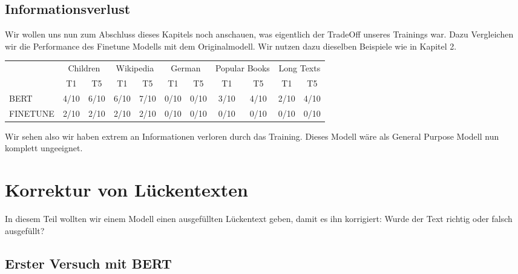 \documentclass[a4paper, 11pt]{article}          %
\begin{document}
\subsection{Informationsverlust}
Wir wollen uns nun zum Abschluss dieses Kapitels noch anschauen, was eigentlich der TradeOff unseres Trainings war. Dazu Vergleichen wir die Performance des Finetune Modells mit dem Originalmodell. Wir nutzen dazu dieselben Beispiele wie in Kapitel 2. \\
\begin{center}
\begin{tabular}{l cc cc cc cc cc}
& \multicolumn{2}{c}{Children}
& \multicolumn{2}{c}{Wikipedia}
& \multicolumn{2}{c}{German}
& \multicolumn{2}{c}{Popular Books}
& \multicolumn{2}{c}{Long Texts} \\
\cmidrule(lr){2-3}
\cmidrule(lr){4-5}
\cmidrule(lr){6-7}
\cmidrule(lr){8-9}
\cmidrule(lr){10-11}
& T1 & T5 & T1 & T5 & T1 & T5 & T1 & T5 & T1 & T5 \\
\midrule
BERT & 4/10 & 6/10 & 6/10 & 7/10 & 0/10 & 0/10 & 3/10 & 4/10 & 2/10 & 4/10  \\
FINETUNE            & 2/10 & 2/10 & 2/10 & 2/10 & 0/10 & 0/10 & 0/10 & 0/10 & 0/10 & 0/10  \\
\end{tabular}
\end{center}
Wir sehen also wir haben extrem an Informationen verloren durch das Training. Dieses Modell wäre als General Purpose Modell nun komplett ungeeignet.

\section{Korrektur von Lückentexten}
\label{sec:correction}
In diesem Teil wollten wir einem Modell einen ausgefüllten Lückentext geben, damit es ihn korrigiert: Wurde der Text richtig oder falsch ausgefüllt?
\subsection{Erster Versuch mit BERT}

\end{document}
